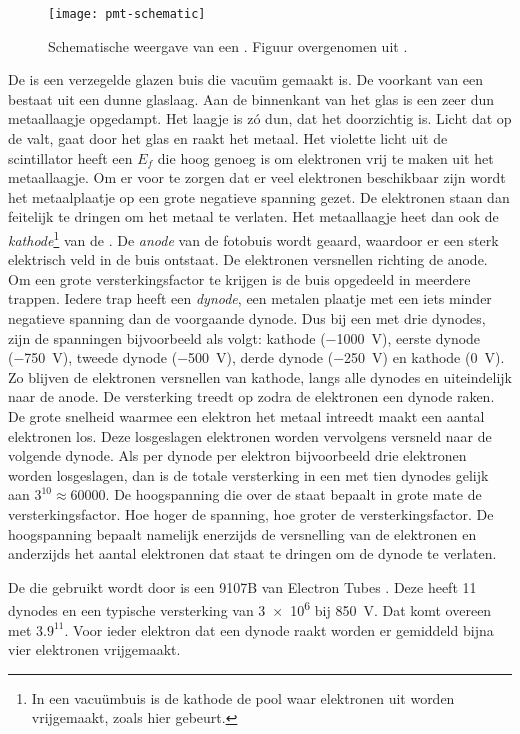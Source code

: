 \begin{figure}
\centering
\texttt{[image: pmt-schematic]}
\caption{Schematische weergave van een \pmt.  Figuur overgenomen uit
\cite{hamamatsu}.}
\label{fig:pmt}
\end{figure}

De \pmt is een verzegelde glazen buis die vacuüm gemaakt
is.  De voorkant van een \pmt bestaat uit een dunne
glaslaag.  Aan de binnenkant van het glas is een zeer dun metaallaagje
opgedampt.  Het laagje is zó dun, dat het doorzichtig is.  Licht dat op de
\pmt valt, gaat door het glas en raakt het metaal.  Het violette licht uit
de scintillator heeft een $E_f$ die hoog genoeg is om elektronen vrij te
maken uit het metaallaagje.  Om er voor te zorgen dat er veel elektronen
beschikbaar zijn wordt het metaalplaatje op een grote negatieve spanning
gezet.  De elektronen staan dan feitelijk te dringen om het metaal te
verlaten.  Het metaallaagje heet dan ook de \emph{kathode}\footnote{In een
vacuümbuis is de kathode de pool waar elektronen uit worden vrijgemaakt,
zoals hier gebeurt.} van de \pmt.  De \emph{anode} van de fotobuis wordt
geaard, waardoor er een sterk elektrisch veld in de buis ontstaat.  De
elektronen versnellen richting de anode.  Om een grote versterkingsfactor
te krijgen is de buis opgedeeld in meerdere trappen.  Iedere trap heeft
een \emph{dynode}, een metalen plaatje met een iets minder negatieve
spanning dan de voorgaande dynode.  Dus bij een \pmt met drie dynodes,
zijn de spanningen bijvoorbeeld als volgt: kathode (\SI{-1000}{\volt}),
eerste dynode (\SI{-750}{\volt}), tweede dynode (\SI{-500}{\volt}), derde
dynode (\SI{-250}{\volt}) en kathode (\SI{0}{\volt}).  Zo blijven de
elektronen versnellen van kathode, langs alle dynodes en uiteindelijk naar
de anode.  De versterking treedt op zodra de elektronen een dynode raken.
De grote snelheid waarmee een elektron het metaal intreedt maakt een
aantal elektronen los.  Deze losgeslagen elektronen worden vervolgens
versneld naar de volgende dynode.  Als per dynode per elektron
bijvoorbeeld drie elektronen worden losgeslagen, dan is de totale
versterking in een \pmt met tien dynodes gelijk aan $3^{10} \approx
\num{60000}$.  De hoogspanning die over de \pmt staat bepaalt in grote
mate de versterkingsfactor.  Hoe hoger de spanning, hoe groter de
versterkingsfactor.  De hoogspanning bepaalt namelijk enerzijds de
versnelling van de elektronen en anderzijds het aantal elektronen dat
staat te dringen om de dynode te verlaten.

De \pmt die gebruikt wordt door \hisparc is een 9107B van Electron
Tubes \cite{9107B}.  Deze heeft 11 dynodes en een typische versterking van
\num{3e6} bij \SI{850}{\volt}.  Dat komt overeen met $\num{3.9}^{11}$.  Voor
ieder elektron dat een dynode raakt worden er gemiddeld bijna vier
elektronen vrijgemaakt.


